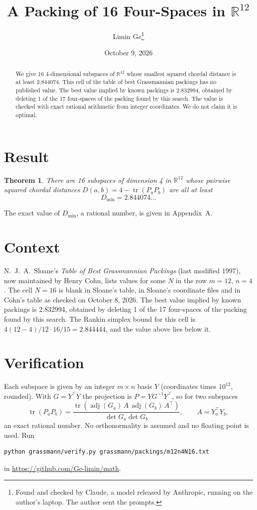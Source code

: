 \documentclass[11pt,a4paper]{article}
\title{A Packing of 16 Four-Spaces in $\mathbb{R}^{12}$}
\author{Limin Ge\thanks{Found and checked by Claude, a model released by Anthropic, running on the author's laptop. The author sent the prompts.}}
\date{October 9, 2026}
\newtheorem*{theorem}{Theorem}
\begin{document}
\maketitle
\begin{abstract}
We give 16 4-dimensional subspaces of $\mathbb{R}^{12}$ whose smallest squared chordal distance is at least 2.844074. This cell of the table of best Grassmannian packings has no published value. The best value implied by known packings is 2.832994, obtained by deleting 1 of the 17 four-spaces of the packing found by this search. The value is checked with exact rational arithmetic from integer coordinates. We do not claim it is optimal.
\end{abstract}

\section{Result}
\begin{theorem}
There are 16 subspaces of dimension 4 in $\mathbb{R}^{12}$ whose pairwise squared chordal distances $D(a,b) = 4 - \operatorname{tr}(P_aP_b)$ are all at least
\[ D_{\min} = 2.844074\ldots \]
\end{theorem}
The exact value of $D_{\min}$, a rational number, is given in Appendix~A.


\section{Context}
N.~J.~A.~Sloane's \emph{Table of Best Grassmannian Packings} (last modified 1997), now maintained by Henry Cohn, lists values for some $N$ in the row $m=12$, $n=4$. The cell $N=16$ is blank in Sloane's table, in Sloane's coordinate files and in Cohn's table as checked on October 8, 2026. The best value implied by known packings is 2.832994, obtained by deleting 1 of the 17 four-spaces of the packing found by this search. The Rankin simplex bound for this cell is $4(12-4)/12\cdot 16/15 = 2.844444$, and the value above lies below it.


\section{Verification}
Each subspace is given by an integer $m\times n$ basis $Y$ (coordinates times $10^{12}$, rounded). With $G=Y^\top Y$ the projection is $P=YG^{-1}Y^\top$, so for two subspaces
\[ \operatorname{tr}(P_aP_b)=\frac{\operatorname{tr}(\operatorname{adj}(G_a)\,A\,\operatorname{adj}(G_b)\,A^\top)}{\det G_a\det G_b},\qquad A=Y_a^\top Y_b, \]
an exact rational number. No orthonormality is assumed and no floating point is used. Run
\begin{verbatim}
python grassmann/verify.py grassmann/packings/m12n4N16.txt
\end{verbatim}
in \url{https://github.com/Ge-limin/math}.
\end{document}
